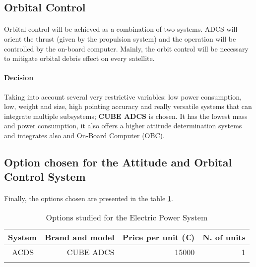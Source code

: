 \subsection{Orbital Control}
\paragraph{}Orbital control will be achieved as a combination of two systems. ADCS will orient the thrust (given by the propulsion system) and the operation will be controlled by the on-board computer. Mainly, the orbit control will be necessary to mitigate orbital debris effect on every satellite.

\paragraph{Decision} Taking into account several very restrictive variables: low power consumption, low, weight and size, high pointing accuracy and really versatile systems that can integrate multiple subsystems; \textbf{CUBE ADCS} is chosen. It has the lowest mass and power consumption, it also offers a higher attitude determination systems and integrates also and On-Board Computer (OBC).

\subsection{Option chosen for the Attitude and Orbital Control System}

\paragraph{}Finally, the options chosen are presented in the table \ref{epsfinal}.

\begin{longtable}{| l | r | r | r | }
\hline
\rowcolor[gray]{0.80}	\textbf{System} &  \textbf{Brand and model}     & \textbf{Price per unit (\euro)}  & \textbf{N. of units}  \\
\hline
\endfirsthead

	   ~ACDS & CUBE ADCS & 15000 & 1\\
	\hline

\caption{Options studied for the Electric Power System}
\label{epsfinal}
\end{longtable}


